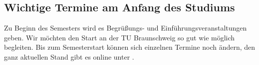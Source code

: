 \subsection{Wichtige Termine am Anfang des Studiums}


Zu Beginn des Semesters wird es Begrüßungs- und Einführungsveranstaltungen geben. Wir möchten den Start an der TU Braunschweig so gut wie möglich begleiten. Bis zum Semesterstart können sich einzelnen Termine noch ändern, den ganz aktuellen Stand gibt es online unter .

\renewcommand{\labelitemi}{$\bullet$}
\renewcommand{\labelitemii}{$\bullet$}
\renewcommand{\labelitemiii}{$\bullet$}
\renewcommand{\labelitemiv}{$\bullet$}

